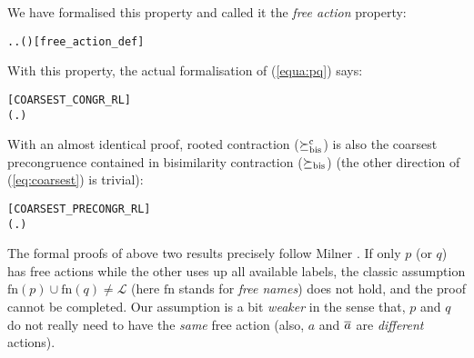 We have formalised this property and
 called it the \emph{free action} property:
\begin{alltt}
  \HOLSymConst{\HOLTokenEquiv{}} \HOLSymConst{\HOLTokenExists{}}. \HOLSymConst{\HOLTokenForall{}}. \HOLSymConst{\HOLTokenNeg{}}( \HOLTokenWeakTransBegin{} \HOLTokenWeakTransEnd {})\hfill{[free_action_def]}
\end{alltt}
%
With this property, the actual formalisation of (\ref{equa:pq}) says:
\vspace{-2ex}
\begin{alltt}
\hfill{[COARSEST_CONGR_RL]}
\HOLTokenTurnstile{}   \HOLSymConst{\HOLTokenConj{}}   \HOLSymConst{\HOLTokenImp{}} (\HOLSymConst{\HOLTokenForall{}}.  \HOLSymConst{\ensuremath{+}}  \HOLSymConst{\HOLTokenWeakEQ}  \HOLSymConst{\ensuremath{+}} ) \HOLSymConst{\HOLTokenImp{}}  \HOLSymConst{\HOLTokenObsCongr} 
\end{alltt}

With an almost identical proof, rooted contraction
($\mathrel{\succeq^{\rm{c}}_{\rm{bis}}}$) is also the coarsest
precongruence contained in bisimilarity contraction ($\mathrel{\succeq_{\rm{bis}}}$)
(the other direction of (\ref{eq:coarsest}) is trivial):
\vspace{-2ex}
\begin{alltt}
\hfill{[COARSEST_PRECONGR_RL]}
\HOLTokenTurnstile{}   \HOLSymConst{\HOLTokenConj{}}   \HOLSymConst{\HOLTokenImp{}} (\HOLSymConst{\HOLTokenForall{}}.  \HOLSymConst{\ensuremath{+}}  \HOLSymConst{\HOLTokenContracts{}}  \HOLSymConst{\ensuremath{+}} ) \HOLSymConst{\HOLTokenImp{}}  \HOLSymConst{\HOLTokenObsContracts} 
\end{alltt}

The formal proofs of above two results precisely follow Milner
\cite{Mil89}. If only $p$ (or $q$) has free actions while the other uses up all available
labels, the classic assumption $\mathrm{fn}(p) \cup
\mathrm{fn}(q) \neq \mathscr{L}$ (here $\mathrm{fn}$ stands for \emph{free
  names}) does not hold, and the proof cannot be completed. Our
assumption is a bit \emph{weaker}
in the sense that, $p$ and $q$ do not really need to have the
\emph{same} free action (also, $a$ and $\overline{a}$ are
\emph{different} actions).


